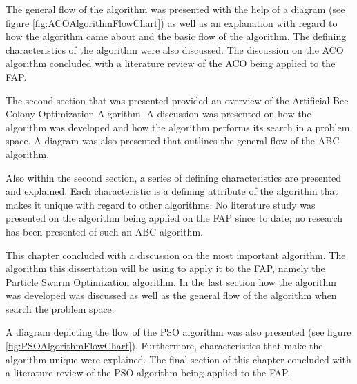 The general flow of the algorithm was presented with the help of a diagram (see figure \ref{fig:ACOAlgorithmFlowChart}) as well as an explanation with regard to how the algorithm came about and the basic flow of the algorithm. The defining characteristics of the algorithm were also discussed. The discussion on the ACO algorithm concluded with a literature review of the ACO being applied to the FAP.

The second section that was presented provided an overview of the Artificial Bee Colony Optimization Algorithm. A discussion was presented on how the algorithm was developed and how the algorithm performs its search in a problem space. A diagram was also presented that outlines the general flow of the ABC algorithm.

Also within the second section, a series of defining characteristics are presented and explained. Each characteristic is a defining attribute of the algorithm that makes it unique with regard to other algorithms. No literature study was presented on the algorithm being applied on the FAP since to date; no research has been presented of such an ABC algorithm.

This chapter concluded with a discussion on the most important algorithm. The algorithm this dissertation will be using to apply it to the FAP, namely the Particle Swarm Optimization algorithm. In the last section how the algorithm was developed was discussed as well as the general flow of the algorithm when search the problem space.

A diagram depicting the flow of the PSO algorithm was also presented (see figure \ref{fig:PSOAlgorithmFlowChart}). Furthermore, characteristics that make the algorithm unique were explained. The final section of this chapter concluded with a literature review of the PSO algorithm being applied to the FAP.
